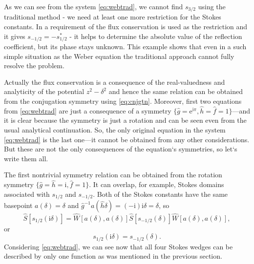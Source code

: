 \documentclass[atmp]{ipart_v1}
\def\rme{\mathrm{e}}
\def\rmi{\mathrm{i}}
\def\f{\hat{f}}
\def\g{\hat{g}}
\def\h{\hat{h}}
\def\S{\widehat{S}}
\def\W{\widehat{W}}
\def\unity{1}
\newcommand\eref[1]{\eqref{#1}}
\begin{document}
As we can see from the system \eref{eq:webtrad}, we cannot find $s_{3/2}$ using the traditional method - 
we need at least one more restriction for the Stokes constants. In \cite{rwbook} a 
requirement of the flux conservation is used as the restriction 
and it gives $s_{-1/2}=-s_{1/2}^*$ - it helps to determine the absolute value of the
reflection coefficient, but its phase stays unknown. This example shows that even in 
a such simple situation as the Weber equation the traditional approach cannot fully 
resolve the problem.
 
Actually the flux conservation is a consequence of the real-valuedness and analyticity 
of the potential $z^2-\delta^2$ and hence the same relation can be obtained from the 
conjugation symmetry using \eref{eq:cnjgtn}. Moreover, first two equations from \eref{eq:webtrad} 
are just a consequence of a symmetry $\{\g=\rme^{\rmi\pi},\h=\f=\unity\}$---and it is clear 
because the symmetry is just a rotation and can be seen even from the usual analytical continuation. 
So, the only original equation in the system \eref{eq:webtrad} is the last one---it cannot 
be obtained from any other considerations. But these are not the only consequences of the 
equation`s symmetries, so let`s write them all.

The first nontrivial symmetry relation can be obtained from the rotation symmetry 
$\{\g=\h=\rmi,\f=\unity\}$. It can overlap, for example, Stokes domains associated with
$s_{1/2}$ and $s_{-1/2}$. Both of the Stokes constants have the same 
basepoint $a(\delta)=\delta$ and $\g^{-1}a(\h\delta)=(-\rmi)\rmi\delta=\delta$, so
\begin{equation}
\S \left[ s_{1/2}(\rmi \delta) \right] = 
\W \left[ a(\delta), a(\delta) \right]
\S \left[ s_{-1/2}(\delta) \right]
\W \left[ a(\delta), a(\delta) \right],
\end{equation}
or
\begin{equation}
s_{1/2}(\rmi \delta) = s_{-1/2}(\delta).
\label{eq:websym_1}
\end{equation}
Considering \eref{eq:webtrad}, we can 
see now that all four Stokes wedges can be described by only one function as 
was mentioned in the previous section. 
\end{document}
